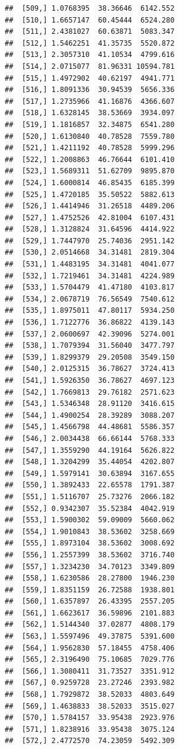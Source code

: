 \documentclass[article]{jss}\usepackage[]{graphicx}\usepackage[]{xcolor}
\makeatletter
\newenvironment{kframe}{%
 \def\at@end@of@kframe{}%
 \ifinner\ifhmode%
  \def\at@end@of@kframe{\end{minipage}}%
  \begin{minipage}{\columnwidth}%
 \fi\fi%
 \def\FrameCommand##1{\hskip\@totalleftmargin \hskip-\fboxsep
 \colorbox{shadecolor}{##1}\hskip-\fboxsep
     \hskip-\linewidth \hskip-\@totalleftmargin \hskip\columnwidth}%
 \MakeFramed {\advance\hsize-\width
   \@totalleftmargin\z@ \linewidth\hsize
   \@setminipage}}%
 {\par\unskip\endMakeFramed%
 \at@end@of@kframe}
\newenvironment{knitrout}{}{} %
\makeatother
\begin{document}
\begin{knitrout}
\begin{kframe}
\begin{verbatim}
##  [509,] 1.0768395  38.36646  6142.552
##  [510,] 1.6657147  60.45444  6524.280
##  [511,] 2.4381027  60.63871  5083.347
##  [512,] 1.5462251  41.35735  5520.872
##  [513,] 2.3057310  41.10534  4799.616
##  [514,] 2.0715077  81.96331 10594.781
##  [515,] 1.4972902  40.62197  4941.771
##  [516,] 1.8091336  30.94539  5656.336
##  [517,] 1.2735966  41.16876  4366.607
##  [518,] 1.6328145  38.53669  3934.097
##  [519,] 1.1816857  32.34875  6541.280
##  [520,] 1.6130840  40.78528  7559.780
##  [521,] 1.4211192  40.78528  5999.296
##  [522,] 1.2008863  46.76644  6101.410
##  [523,] 1.5689311  51.62709  9895.870
##  [524,] 1.6000814  46.85435  6185.399
##  [525,] 1.4720185  35.50522  5882.613
##  [526,] 1.4414946  31.26518  4489.206
##  [527,] 1.4752526  42.81004  6107.431
##  [528,] 1.3128824  31.64596  4414.922
##  [529,] 1.7447970  25.74036  2951.142
##  [530,] 2.0514668  34.31481  2819.304
##  [531,] 1.4483195  34.31481  4041.077
##  [532,] 1.7219461  34.31481  4224.989
##  [533,] 1.5704479  41.47180  4103.817
##  [534,] 2.0678719  76.56549  7540.612
##  [535,] 1.8975011  47.80117  5934.250
##  [536,] 1.7122776  36.86822  4139.143
##  [537,] 2.0600697  42.39096  5274.001
##  [538,] 1.7079394  31.56040  3477.797
##  [539,] 1.8299379  29.20508  3549.150
##  [540,] 2.0125315  36.78627  3724.413
##  [541,] 1.5926350  36.78627  4697.123
##  [542,] 1.7669813  29.76182  2571.623
##  [543,] 1.5346348  28.91120  3416.615
##  [544,] 1.4900254  28.39289  3088.207
##  [545,] 1.4566798  44.48681  5586.357
##  [546,] 2.0034438  66.66144  5768.333
##  [547,] 1.3559290  44.19164  5626.822
##  [548,] 1.3204299  35.44054  4202.807
##  [549,] 1.5979141  30.63894  3167.655
##  [550,] 1.3892433  22.65578  1791.387
##  [551,] 1.5116707  25.73276  2066.182
##  [552,] 0.9342307  35.52384  4042.919
##  [553,] 1.5900302  59.09009  5660.062
##  [554,] 1.9010843  38.53602  3258.669
##  [555,] 1.8973104  38.53602  3008.692
##  [556,] 1.2557399  38.53602  3716.740
##  [557,] 1.3234230  34.70123  3349.809
##  [558,] 1.6230586  28.27800  1946.230
##  [559,] 1.8351159  26.72588  1938.801
##  [560,] 1.6357897  26.43395  2557.205
##  [561,] 1.6623617  36.59896  2101.883
##  [562,] 1.5144340  37.02877  4808.179
##  [563,] 1.5597496  49.37875  5391.600
##  [564,] 1.9562830  57.18455  4758.406
##  [565,] 2.3196490  75.10685  7029.776
##  [566,] 1.3080411  31.73527  3351.912
##  [567,] 0.9259728  23.27246  2393.982
##  [568,] 1.7929872  38.52033  4803.649
##  [569,] 1.4638833  38.52033  3515.027
##  [570,] 1.5784157  33.95438  2923.976
##  [571,] 1.8238916  33.95438  3075.124
##  [572,] 2.4772570  74.23059  5492.309

\end{verbatim}
\end{kframe}
\end{knitrout}
\end{document}

